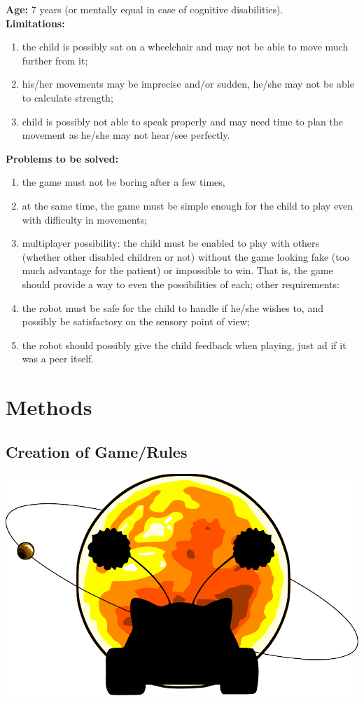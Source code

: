 \documentclass[a4paper,twoside]{book}
\begin{document}
\textbf{Age:} 7 years (or mentally equal in case of cognitive disabilities).
\\

\textbf{Limitations:}
\begin{enumerate}
\item the child is possibly sat on a wheelchair and may not be able to move much further from it;
\item his/her movements may be imprecise and/or sudden, he/she may not be able to calculate strength;
\item child is possibly not able to speak properly and may need time to plan the movement as he/she may not hear/see perfectly.
\end{enumerate}

\textbf{Problems to be solved:}
\begin{enumerate}
\item the game must not be boring after a few times,
\item at the same time, the game must be simple enough for the child to play even with difficulty in movements;
\item multi\textendash player possibility: the child must be enabled to play with others (whether other disabled children or not) without the game looking fake (too much advantage for the patient) or impossible to win. That is, the game should provide a way to even the possibilities of each;  
other requirements:
\item the robot must be safe for the child to handle if he/she wishes to, and possibly be satisfactory on the sensory point of view;
\item the robot should possibly give the child feedback when playing, just ad if it was a peer itself.
\end{enumerate}

\chapter{Methods}

\section{Creation of Game/Rules}

\includegraphics[width=\textwidth]{img/logo_finito}
\end{document}
